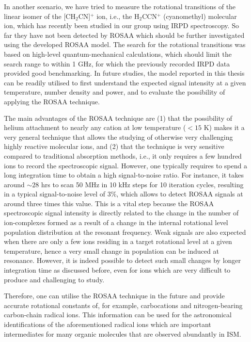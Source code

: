 In another scenario, we have tried to measure the rotational transitions of the linear isomer of the [CH$_2$CN]$^+$ ion, 
i.e., the H$_2$CCN$^+$ (cyanomethyl) molecular ion, which has recently been studied in our group using IRPD 
spectroscopy. So  far they have not been detected by ROSAA which should be further investigated using the developed 
ROSAA model. The search for the rotational transitions was based
on high-level quantum-mechanical calculations, which should limit the search
range to within 1 GHz, for which the previously recorded IRPD data provided good benchmarking. 
In future studies, the model reported in this thesis can be readily utilised to first understand the 
expected signal intensity at a given temperature, number density and power, and to evaluate the possibility of applying 
the ROSAA technique.

The main advantages of the ROSAA technique are (1) that the possibility of helium attachment to nearly any cation at 
low temperature ($< 15$ K) makes it a very general technique that allows the studying of otherwise very challenging highly reactive molecular ions, 
and (2) that the technique is very sensitive compared to traditional absorption methods, 
i.e., it only requires a few hundred ions to record the spectroscopic signal.
However, one typically requires to spend a long integration time
to obtain a high signal-to-noise ratio. For instance, it takes around $\sim 28$ hrs to scan 50 MHz in 10 kHz steps for 10 iteration cycles, resulting in a typical signal-to-noise level of $3 \%$, which allows to detect ROSAA signals at around three times this value. This is a vital step because 
the ROSAA spectroscopic signal intensity is directly related to the change in the number of ion-complexes 
formed as a result of a change in the internal rotational level population distribution at the resonant frequency.
Weak signals are also expected when there are only a few ions 
residing in a target rotational level at a given temperature, hence a very small change 
in population can be induced at resonance. However, it is indeed possible to detect 
such small changes by longer integration time as discussed before, even for ions which are very difficult 
to produce and challenging to study.

Therefore, one can utilise the ROSAA technique in the future and provide accurate rotational constants of, for example, carbocations and nitrogen-bearing carbon-chain radical ions. This information can be used for the astronomical identifications of the aforementioned radical ions which are important intermediates for many organic molecules that are observed abundantly in ISM.

